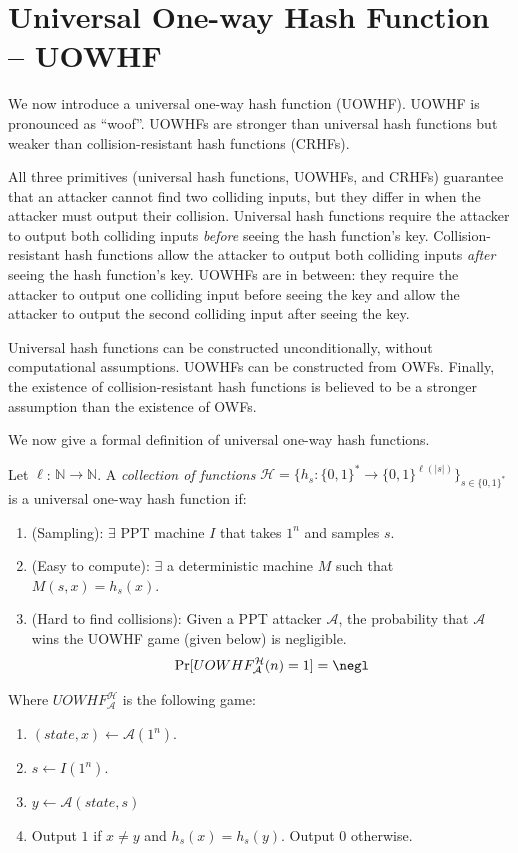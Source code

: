 \documentclass[12pt]{tufte-book}
\newcommand{\bit}{\{0,1\}}
\begin{document}
\section{Universal One-way Hash Function -- UOWHF}
We now introduce a universal one-way hash function (UOWHF). UOWHF is pronounced as ``woof''.
UOWHFs are stronger than universal hash functions but weaker than collision-resistant hash functions (CRHFs). 

All three primitives (universal hash functions, UOWHFs, and CRHFs) guarantee that an attacker cannot find two colliding inputs, but they differ in when the attacker must output their collision. Universal hash functions require the attacker to output both colliding inputs \textit{before} seeing the hash function's key. Collision-resistant hash functions allow the attacker to output both colliding inputs \textit{after} seeing the hash function's key. UOWHFs are in between: they require the attacker to output one colliding input before seeing the key and allow the attacker to output the second colliding input after seeing the key.

Universal hash functions can be constructed unconditionally, without computational assumptions. UOWHFs can be constructed from OWFs. Finally, the existence of collision-resistant hash functions is believed to be a stronger assumption than the existence of OWFs.

We now give a formal definition of universal one-way hash functions. 
\begin{definition}
    Let $\ell$: $\mathbb{N}\rightarrow\mathbb{N}$. A \textit{collection of functions} 
    $\mathcal{H} = \{h_s: \bit^*\rightarrow\bit^{\ell(|s|)}\}_{s\in\bit^{*}}$ is a universal one-way hash function if:
    \begin{enumerate}
        \item (Sampling): $\exists$ PPT machine $I$ that takes $1^n$ and samples $s$.
        \item (Easy to compute): $\exists$ a deterministic machine $M$ such that $M(s,x)=h_s(x)$.
        \item (Hard to find collisions): Given a PPT attacker $\mathcal{A}$, the probability that $\mathcal{A}$ wins the UOWHF game (given below) is negligible. 
        \[
            \Pr[UOWHF^{\mathcal{H}}_{\mathcal{A}}(n)=1]=\negl
        \]
    \end{enumerate}
\end{definition}
Where $UOWHF^{\mathcal{H}}_{\mathcal{A}}$ is the following game:
\begin{enumerate}
    \item $(state, x)\leftarrow\mathcal{A}(1^n)$.
    \item $s\leftarrow I(1^n)$.
    \item $y\leftarrow\mathcal{A}(state, s)$
    \item Output $1$ if $x \neq y$ and $h_s(x)=h_s(y)$. Output $0$ otherwise.
\end{enumerate}
\end{document}
